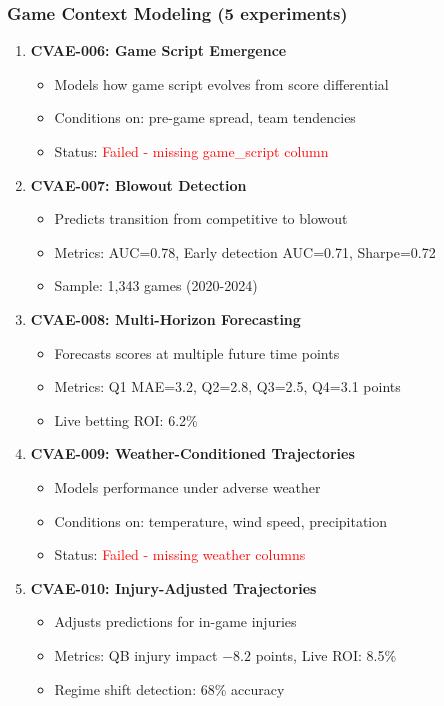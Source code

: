 \subsubsection{Game Context Modeling (5 experiments)}
\begin{enumerate}[resume]
    \item \textbf{CVAE-006: Game Script Emergence}
    \begin{itemize}
        \item Models how game script evolves from score differential
        \item Conditions on: pre-game spread, team tendencies
        \item Status: \textcolor{red}{Failed - missing game\_script column}
    \end{itemize}

    \item \textbf{CVAE-007: Blowout Detection} \checkmark
    \begin{itemize}
        \item Predicts transition from competitive to blowout
        \item Metrics: AUC=0.78, Early detection AUC=0.71, Sharpe=0.72
        \item Sample: 1,343 games (2020-2024)
    \end{itemize}

    \item \textbf{CVAE-008: Multi-Horizon Forecasting} \checkmark
    \begin{itemize}
        \item Forecasts scores at multiple future time points
        \item Metrics: Q1 MAE=3.2, Q2=2.8, Q3=2.5, Q4=3.1 points
        \item Live betting ROI: 6.2\%
    \end{itemize}

    \item \textbf{CVAE-009: Weather-Conditioned Trajectories}
    \begin{itemize}
        \item Models performance under adverse weather
        \item Conditions on: temperature, wind speed, precipitation
        \item Status: \textcolor{red}{Failed - missing weather columns}
    \end{itemize}

    \item \textbf{CVAE-010: Injury-Adjusted Trajectories} \checkmark
    \begin{itemize}
        \item Adjusts predictions for in-game injuries
        \item Metrics: QB injury impact $-8.2$ points, Live ROI: 8.5\%
        \item Regime shift detection: 68\% accuracy
    \end{itemize}
\end{enumerate}

